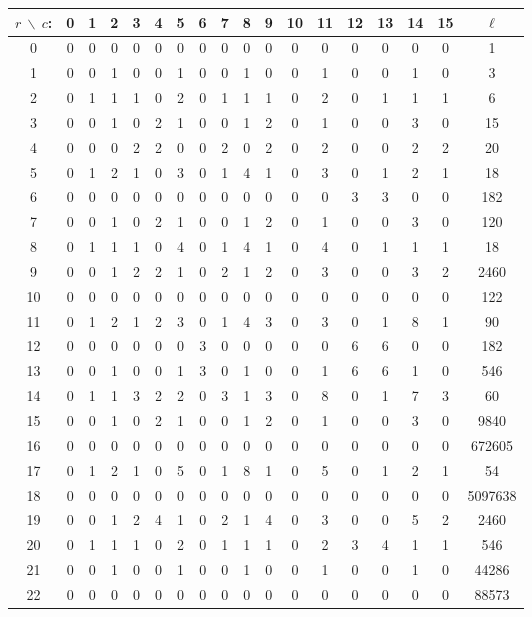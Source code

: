 \begin{table}\label{tab:n3}
\begin{center}
\begin{adjustbox}{max width=\textwidth}
\begin{tabular}{|c|cccccccccccccccc|c|}
\hline
$r\ \backslash\ c$:&0 &1 &2 &3 &4 &5 &6 &7 &8 &9 &10 &11 &12 &13 &14 &15 &$\ell$
\\
\hline
\hline
 0 &0 &0 &0 &0 &0 &0 &0 &0 &0 &0 &0 &0 &0 &0 &0 &0 &1\\
 1 &0 &0 &1 &0 &0 &1 &0 &0 &1 &0 &0 &1 &0 &0 &1 &0 &3\\
 2 &0 &1 &1 &1 &0 &2 &0 &1 &1 &1 &0 &2 &0 &1 &1 &1 &6\\
 3 &0 &0 &1 &0 &2 &1 &0 &0 &1 &2 &0 &1 &0 &0 &3 &0 &15\\
 4 &0 &0 &0 &2 &2 &0 &0 &2 &0 &2 &0 &2 &0 &0 &2 &2 &20\\
 5 &0 &1 &2 &1 &0 &3 &0 &1 &4 &1 &0 &3 &0 &1 &2 &1 &18\\
 6 &0 &0 &0 &0 &0 &0 &0 &0 &0 &0 &0 &0 &3 &3 &0 &0 &182\\
 7 &0 &0 &1 &0 &2 &1 &0 &0 &1 &2 &0 &1 &0 &0 &3 &0 &120\\
 8 &0 &1 &1 &1 &0 &4 &0 &1 &4 &1 &0 &4 &0 &1 &1 &1 &18\\
 9 &0 &0 &1 &2 &2 &1 &0 &2 &1 &2 &0 &3 &0 &0 &3 &2 &2460\\
10 &0 &0 &0 &0 &0 &0 &0 &0 &0 &0 &0 &0 &0 &0 &0 &0 &122\\
11 &0 &1 &2 &1 &2 &3 &0 &1 &4 &3 &0 &3 &0 &1 &8 &1 &90\\
12 &0 &0 &0 &0 &0 &0 &3 &0 &0 &0 &0 &0 &6 &6 &0 &0 &182\\
13 &0 &0 &1 &0 &0 &1 &3 &0 &1 &0 &0 &1 &6 &6 &1 &0 &546\\
14 &0 &1 &1 &3 &2 &2 &0 &3 &1 &3 &0 &8 &0 &1 &7 &3 &60\\
15 &0 &0 &1 &0 &2 &1 &0 &0 &1 &2 &0 &1 &0 &0 &3 &0 &9840\\
16 &0 &0 &0 &0 &0 &0 &0 &0 &0 &0 &0 &0 &0 &0 &0 &0 &672605\\
17 &0 &1 &2 &1 &0 &5 &0 &1 &8 &1 &0 &5 &0 &1 &2 &1 &54\\
18 &0 &0 &0 &0 &0 &0 &0 &0 &0 &0 &0 &0 &0 &0 &0 &0 &5097638\\
19 &0 &0 &1 &2 &4 &1 &0 &2 &1 &4 &0 &3 &0 &0 &5 &2 &2460\\
20 &0 &1 &1 &1 &0 &2 &0 &1 &1 &1 &0 &2 &3 &4 &1 &1 &546\\
21 &0 &0 &1 &0 &0 &1 &0 &0 &1 &0 &0 &1 &0 &0 &1 &0 &44286\\
22 &0 &0 &0 &0 &0 &0 &0 &0 &0 &0 &0 &0 &0 &0 &0 &0 &88573\\

\end{tabular}
\end{adjustbox}
\end{center}
\end{table}
